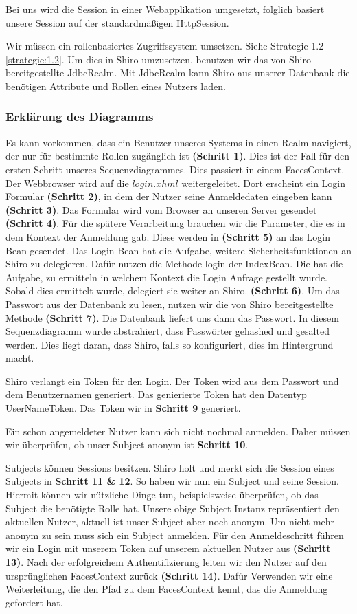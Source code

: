 \documentclass[enabledeprecatedfontcommands,fontsize=12pt,paper=a4,twoside]{scrartcl}
\begin{document}
{Bei uns wird die Session in einer Webapplikation umgesetzt, folglich basiert
unsere Session auf der standardmäßigen HttpSession.

Wir müssen ein rollenbasiertes Zugriffssystem umsetzen.
Siehe Strategie 1.2 \ref{strategie:1.2}. Um dies in Shiro umzusetzen, benutzen wir das von Shiro bereitgestellte
JdbcRealm. Mit JdbcRealm kann Shiro aus unserer Datenbank die benötigen
Attribute und Rollen eines Nutzers laden.

\subsubsection{Erklärung des Diagramms}
Es kann vorkommen, dass ein Benutzer unseres Systems in einen Realm navigiert,
der nur für bestimmte Rollen zugänglich ist \textbf{(Schritt 1)}. Dies ist der Fall
für den ersten Schritt unseres Sequenzdiagrammes. Dies passiert in einem
FacesContext. Der Webbrowser wird auf die $login.xhml$ weitergeleitet. Dort erscheint
ein Login Formular \textbf{(Schritt 2)}, in dem der Nutzer seine Anmeldedaten
eingeben kann \textbf{(Schritt 3)}. Das Formular wird vom Browser an unseren
Server gesendet \textbf{(Schritt 4)}. Für die spätere Verarbeitung brauchen
wir die Parameter, die es in dem Kontext der Anmeldung gab. Diese werden in
\textbf{(Schritt 5)} an das Login Bean gesendet. Das Login Bean hat die Aufgabe,
weitere Sicherheitsfunktionen an Shiro zu delegieren. Dafür nutzen die Methode login
der IndexBean. Die hat die Aufgabe, zu ermitteln in welchem Kontext die
Login Anfrage gestellt wurde. Sobald dies ermittelt wurde, delegiert sie
weiter an Shiro. \textbf{(Schritt 6)}. Um das Passwort aus der Datenbank zu lesen,
nutzen wir die von Shiro bereitgestellte Methode \textbf{(Schritt 7)}. Die Datenbank
liefert uns dann das Passwort. In diesem Sequenzdiagramm wurde abstrahiert, dass
Passwörter gehashed und gesalted werden. Dies liegt daran, dass Shiro, falls so
konfiguriert, dies im Hintergrund macht.

Shiro verlangt ein Token für den Login. Der Token wird aus dem Passwort
und dem Benutzernamen generiert. Das genierierte Token hat den Datentyp
UserNameToken.  Das Token wir in \textbf{Schritt 9} generiert.


Ein schon angemeldeter Nutzer kann sich nicht nochmal anmelden. Daher müssen wir
überprüfen, ob unser Subject anonym ist \textbf{Schritt 10}.

Subjects können Sessions besitzen. Shiro holt und merkt sich die Session eines
Subjects in \textbf{Schritt 11 \& 12}. So haben wir nun ein Subject und seine Session.
Hiermit können wir nützliche Dinge tun, beispielsweise überprüfen, ob das
Subject die benötigte Rolle hat. Unsere obige Subject Instanz repräsentiert
den aktuellen Nutzer, aktuell ist unser Subject aber noch anonym. Um nicht mehr
anonym zu sein muss sich ein Subject anmelden. Für den Anmeldeschritt führen wir
ein Login mit unserem Token auf unserem aktuellen Nutzer aus \textbf{(Schritt
  13)}. Nach der erfolgreichem Authentifizierung leiten wir den Nutzer auf den
ursprünglichen FacesContext zurück \textbf{(Schritt 14)}. Dafür Verwenden wir
eine Weiterleitung, die den Pfad zu dem FacesContext kennt, das die Anmeldung
gefordert hat.

}
\end{document}
